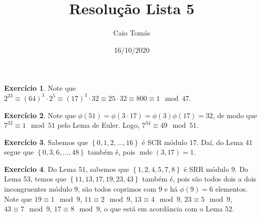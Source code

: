 \documentclass[a4paper,12pt]{article}
\title{Resolução Lista 5}
\date{16/10/2020}
\author{Caio Tomás}
\DeclareMathOperator{\mdc}{mdc}
\theoremstyle{definition}
\newtheorem{exercise}{Exercício}%
\begin{document}
	\maketitle
	\begin{exercise}
		Note que $2^{23} \equiv (64)^3\cdot 2^5 \equiv (17)^3\cdot 32 \equiv 25\cdot 32 \equiv 800 \equiv 1\mod 47$.   
	\end{exercise}
	\begin{exercise}
		Note que $\phi(51) = \phi(3\cdot 17) = \phi(3)\phi(17) = 32$, de modo que $7^{32}\equiv 1\mod 51$ pelo Lema de Euler. Logo, $7^{34}\equiv 49\mod 51$.
	\end{exercise}
	\begin{exercise}
		Sabemos que $\left\{ 0,1,2,\dots,16 \right\}$ é SCR módulo $17$. Daí, do Lema 41 segue que $\left\{ 0,3,6,\dots,48 \right\}$ também é, pois $\mdc(3,17) = 1$.
	\end{exercise}
	\begin{exercise}
		Do Lema 51, sabemos que $\left\{ 1, 2, 4, 5, 7, 8 \right\}$ é SRR módulo $9$. Do Lema 53, temos que $\left\{ 11, 13, 17, 19, 23, 43 \right\}$ também é, pois são todos dois a dois incongruentes módulo $9$, são todos coprimos com $9$ e há $\phi(9) = 6$ elementos. Note que $19\equiv 1\mod 9$, $11\equiv 2\mod 9$, $13\equiv 4\mod 9$, $23\equiv 5\mod 9$, $43\equiv 7\mod 9$, $17\equiv 8\mod 9$, o que está em acordância com o Lema 52.
	\end{exercise}
\end{document}
